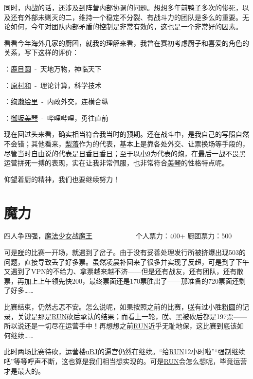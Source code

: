 同时，内战的话，还涉及到阵营内部协调的问题。想想多年前\uline{鸭子}多次的惨死，以及还有外部未剿灭的二，维持一个稳定不分裂、有战斗力的团队是多么的重要。无论如何，今年对团队内部矛盾的控制是非常有效的，这也是一个非常好的因素。

\newpage

看看今年海外几家的厨团，就我的理解来看，我曾在赛初考虑厨子和喜爱的角色的关系，写下这样的评价：

：\uline{鹿目圆}~-~天地万物，神临天下

：\uline{原村和}~-~理论计算，科学技术

：\uline{绚濑绘里}~-~内政外交，连横合纵

：\uline{御坂美琴}~-~哔哩哔哩，勇往直前

现在回过头来看，确实相当符合我当时的预期。还在战斗中，是我自己的写照自然不会错；其他看来，\uline{梨落}作为的代表，基本上是靠各处外交、让票换场等手段的，尽管当时\uline{自由}说的代表是\uline{日香日香日}；至于以\uline{小9}为代表的炮，在最后一战不畏黑运营拼死一搏的表现，实在让我非常佩服，也非常符合\uline{美琴}的性格特点呢。

仰望着厨的精神，我们也要继续努力！

\chapter{魔力}
\begin{center}
{\subTitle 四人争四强，\uline{魔法少女}战\uline{魔王}}
\subMemo
　　　　　　个人票力：400+ 厨团票力：500
\end{center}

可是\uline{咲}的比赛一开场，就遇到了岔子。由于没有妥善处理发行所被挤爆出现503的问题，直接导致丢了好多票。虽然凌晨补回来了很多并实现了反超，可是到了下午又遇到了VPN的不给力、拿票越来越不济——但是还有战友，还有团队，还有散票，再加上上午领先快200，最终票面还是170票胜出了——那准备的720票面还剩了好多……

比赛结束，仍然忐忑不安。怎么说呢，如果按照之前的比赛，\uline{咲}有过小胜\uline{粉圆}的记录，关键是那是\uline{RUN}砍后承认的结果；而看上一轮，\uline{咲}、\uline{黑}被砍后都是197票——所以说还是一切尽在运营手中！再想想之前\uline{RUN}近乎无耻地保，这比赛到底该如何继续……

此时两场比赛待砍，运营楼\uline{uBJ}的逼宫仍然在继续。“给\uline{RUN}12小时啦”“强制继续吧”等等呼声不断，这也算是我们相当想实现的。可是\uline{RUN}会怎么想呢，毕竟运营才是最大的。

